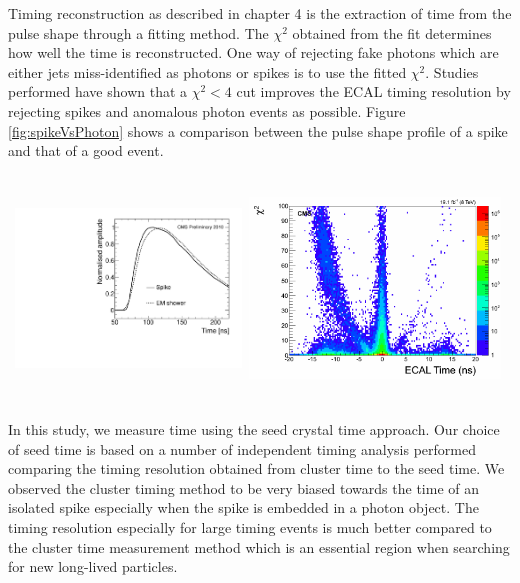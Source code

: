 \par
Timing reconstruction as described in chapter 4 is the extraction of time from the pulse shape through a fitting method. The $\chi^{2}$ obtained from the fit determines how well the time is reconstructed. One way of rejecting fake photons which are either jets miss-identified as photons or spikes is to use the fitted $\chi^{2}$. Studies performed have shown that a  $\chi^{2} < 4 $ cut improves the ECAL timing resolution by rejecting  spikes and anomalous photon events as possible. Figure \ref{fig:spikeVsPhoton} shows a comparison between the pulse shape profile of a spike and that of a good event.
\begin{center}
\centering
\mbox{
\includegraphics[height=6cm, width=0.45\textwidth]{THESISPLOTS/spike_pulse_shape.pdf}
\includegraphics[height=6cm, width=0.5\textwidth]{THESISPLOTS/seedTime_Chi2.png} }
\label{fig:spikeVsPhoton}
\end{center}
\par
  In this study, we measure time using the seed crystal time approach. Our choice of seed time is based on a number of independent timing analysis performed comparing the timing resolution obtained from cluster time to the seed time. We observed the cluster timing method to be very biased towards the time of an isolated spike especially when the spike is embedded in a photon object. The timing resolution especially for large timing events is much better compared to the cluster time measurement method which is an essential region when searching for new long-lived particles.
